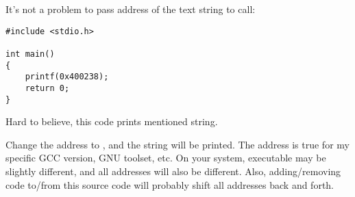 It's not a problem to pass address of the text string  to  call:

\begin{lstlisting}
#include <stdio.h>

int main()
{
    printf(0x400238);
    return 0;
}
\end{lstlisting}

Hard to believe, this code prints mentioned string.

Change the address to , and the  string will be printed.
The address is true for my specific GCC version, GNU toolset, etc.
On your system, executable may be slightly different, and all addresses will also be different.
Also, adding/removing code to/from this source code will probably shift all addresses back and forth.

